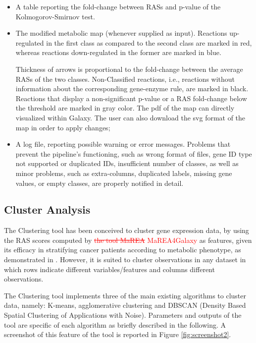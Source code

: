 \documentclass[preprint,12pt,authoryear]{elsarticle}
\newcommand{\red}{\textcolor{red}}
\newcommand{\mareagalaxy}{\textsf{MaREA4Galaxy}}
\newcommand{\mareaTool}{\textsf{MaREA}}
\newcommand{\clusterTool}{\textsf{Clustering}}
\begin{document}
\begin{itemize}
\item A table reporting the fold-change between RASs and p-value of
  the Kolmogorov-Smirnov test.
  
\item The modified metabolic map (whenever supplied as
  input). Reactions up-regulated in the first class as compared to the
  second class  are marked in red, whereas reactions down-regulated in
  the former are marked in blue.
  
  Thickness of arrows is proportional to the fold-change between the
  average RASs of the two classes. Non-Classified reactions, i.e.,
  reactions without information about the corresponding gene-enzyme
  rule, are marked in black.
  Reactions that display a non-significant p-value or a RAS
  fold-change below the threshold are marked in gray color. The pdf of
  the map can directly visualized within Galaxy. The user can also
  download the svg format of the map in order to apply changes;
  
\item A log file, reporting possible warning or error
  messages. Problems that prevent the pipeline's functioning, such as
  wrong format of files, gene ID type not supported or duplicated IDs,
  insufficient number of classes, as well as minor problems, such as
  extra-columns, duplicated labels, missing gene values, or empty
  classes, are properly notified in detail.
\end{itemize}


\subsection{Cluster Analysis}

The \clusterTool{} tool has been conceived to cluster gene expression
data, by using the RAS scores computed by \red{\sout{the tool
    \mareaTool{}} \mareagalaxy{}} as features, given its efficacy in
stratifying cancer patients according to metabolic phenotype, as
demonstrated in \citep{marea}. However, it is suited to cluster
observations in any dataset in which rows indicate different
variables/features and columns different observations.

The \clusterTool{} tool implements three of the main existing algorithms
to cluster data, namely: K-means, agglomerative clustering and DBSCAN
(Density Based Spatial Clustering of Applications with
Noise). Parameters and outputs of the tool are specific of each
algorithm as briefly described in the following.  A screenshot of this
feature of the tool is reported in Figure \ref{fig:screenshot2}.
\end{document}
